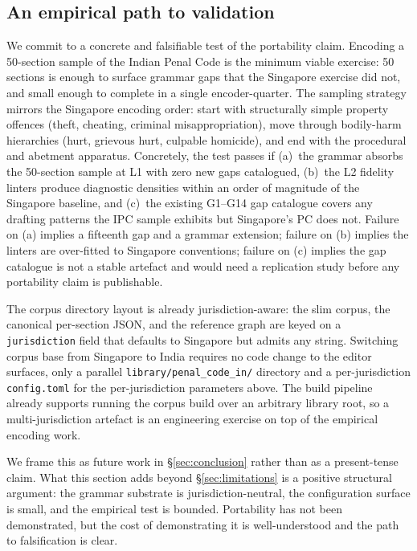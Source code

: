 \subsection{An empirical path to validation}
\label{subsec:portability_path}

We commit to a concrete and falsifiable test of the portability
claim. Encoding a 50-section sample of the Indian Penal Code is the
minimum viable exercise: 50 sections is enough to surface grammar
gaps that the Singapore exercise did not, and small enough to
complete in a single encoder-quarter. The sampling strategy mirrors
the Singapore encoding order: start with structurally simple
property offences (theft, cheating, criminal misappropriation),
move through bodily-harm hierarchies (hurt, grievous hurt, culpable
homicide), and end with the procedural and abetment apparatus.
Concretely, the test passes if (a)~the grammar absorbs the 50-section
sample at L1 with zero new gaps catalogued, (b)~the L2 fidelity
linters produce diagnostic densities within an order of magnitude of
the Singapore baseline, and (c)~the existing G1--G14 gap catalogue
covers any drafting patterns the IPC sample exhibits but Singapore's
PC does not. Failure on (a) implies a fifteenth gap and a grammar
extension; failure on (b) implies the linters are over-fitted to
Singapore conventions; failure on (c) implies the gap catalogue is
not a stable artefact and would need a replication study before any
portability claim is publishable.

The corpus directory layout is already jurisdiction-aware: the slim
corpus, the canonical per-section JSON, and the reference graph are
keyed on a \texttt{jurisdiction} field that defaults to Singapore but
admits any string. Switching corpus base from Singapore to India
requires no code change to the editor surfaces, only a parallel
\texttt{library/penal\_code\_in/} directory and a per-jurisdiction
\texttt{config.toml} for the per-jurisdiction parameters above. The
build pipeline already supports running the corpus build over an
arbitrary library root, so a multi-jurisdiction artefact is an
engineering exercise on top of the empirical encoding work.

We frame this as future work in \S\ref{sec:conclusion} rather than as
a present-tense claim. What this section adds beyond
\S\ref{sec:limitations} is a positive structural argument: the
grammar substrate is jurisdiction-neutral, the configuration surface
is small, and the empirical test is bounded. Portability has not been
demonstrated, but the cost of demonstrating it is well-understood and
the path to falsification is clear.
